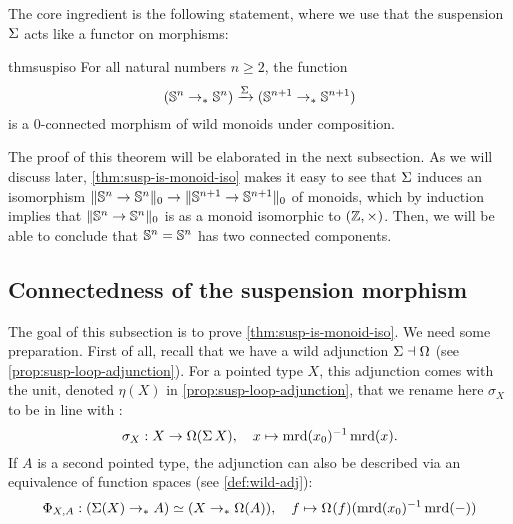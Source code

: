 \documentclass[english,a4paper]{lmcs}
\begin{document}
The core ingredient is the following statement,
where we use that the suspension $\operatorname{\Sigma}$ acts like a functor on morphisms:
\begin{restatable}{thm}{suspiso}
    \label{thm:susp-is-monoid-iso}
    For all natural numbers $n \geq 2$, the function
    \begin{equation} \label{eq:susp-monoid-morphism}
    ({\mathbb S^{n}} \to_* {\mathbb S^{n}}) \xrightarrow{\operatorname{\Sigma}} ({\mathbb S^{n+1}} \to_* {\mathbb S^{n+1}})
    \end{equation}
    is a $0$-connected morphism of wild monoids under composition.
\end{restatable}

The proof of this theorem will be elaborated in the next subsection.
As we will discuss later, \cref{thm:susp-is-monoid-iso} makes it easy to see
that $\operatorname{\Sigma}$ induces an isomorphism 
$\lVert{\mathbb S^{n}} \to {\mathbb S^{n}}\rVert_0 \to \lVert{\mathbb S^{n+1}} \to {\mathbb S^{n+1}}\rVert_0$
of monoids, which by induction implies that $\lVert{\mathbb S^{n}} \to {\mathbb S^{n}}\rVert_0$ 
is as a monoid isomorphic to $(\mathbb{Z}, \times)$. Then, we will be able
to conclude that ${\mathbb S^{n}} = {\mathbb S^{n}}$ has two connected components.

\subsection{Connectedness of the suspension morphism}
%
The goal of this subsection is to prove \cref{thm:susp-is-monoid-iso}. We need
some preparation.  First of all, recall that we have a wild adjunction $\operatorname{\Sigma}
\dashv \Omega$ (see \cref{prop:susp-loop-adjunction}).
%
For a pointed type $X$, this adjunction comes with the unit, denoted $\eta(X)$
in \cref{prop:susp-loop-adjunction}, that we rename here $\sigma_X$ to be in line
with \cite{HoTT}:
\begin{equation}  \label{eq:sigma}
  \sigma_X : X \to \Omega(\operatorname{\Sigma} X), \quad x \mapsto \operatorname{\mathrm{mrd}}(x_0)^{-1} \operatorname{\mathrm{mrd}}(x).
\end{equation}
If $A$ is a second pointed type, the adjunction can also be described via an
equivalence of function spaces (see \cref{def:wild-adj}):
\begin{equation}\label{eq:adj-equivalence-susp-loopspace}
  \Phi_{X,A} : (\susp(X) \ptdto A) \simeq (X \ptdto \Omega(A)),\quad
  f \mapsto \loopspace \null (f)(\inv{\mrd (x_0)} \mrd(\blank))
\end{equation}
\end{document}
